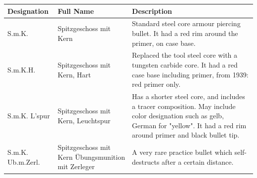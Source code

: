 \documentclass{article}
\begin{document}
\begin{tabular}{lll}
\toprule
Designation & Full Name & Description \\
\midrule
S.m.K. & Spitzgeschoss mit Kern & Standard steel core armour piercing bullet. It had a red rim around the primer, on case base. \\
S.m.K.H. & Spitzgeschoss mit Kern, Hart & Replaced the tool steel core with a tungsten carbide core. It had a red case base including primer, from 1939: red primer only. \\
S.m.K. L'spur & Spitzgeschoss mit Kern, Leuchtspur & Has a shorter steel core, and includes a tracer composition. May include color designation such as gelb, German for "yellow". It had a red rim around primer and black bullet tip. \\
S.m.K. Ub.m.Zerl. & Spitzgeschoss mit Kern Übungsmunition mit Zerleger & A very rare practice bullet which self-destructs after a certain distance. \\
\bottomrule
\end{tabular}
\end{document}
